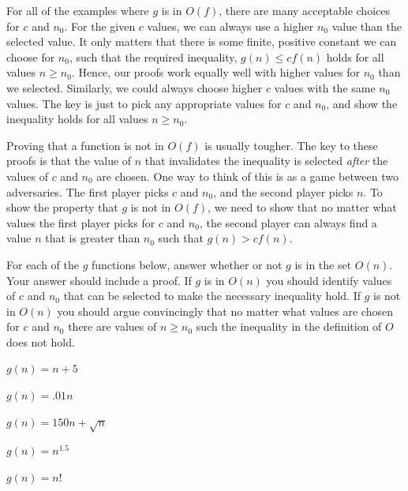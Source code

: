 \begin{schemeregion}
For all of the examples where $g$ is in $O(f)$, there are many acceptable choices for $c$ and $n_0$.  For the given $c$ values, we can always use a higher $n_0$ value than the selected value.  It only matters that there is some finite, positive constant we can choose for $n_0$, such that the required inequality, $g(n) \le cf(n)$ holds for all values $n \ge n_0$.  Hence, our proofs  work equally well with higher values for $n_0$ than we selected.  Similarly, we could always choose higher $c$ values with the same $n_0$ values.  The key is just to pick any appropriate values for $c$ and $n_0$, and show the inequality holds for all values $n \ge n_0$.

Proving that a function is not in $O(f)$ is usually tougher.  The key to these proofs is that the value of $n$ that invalidates the inequality is selected \emph{after} the values of $c$ and $n_0$ are chosen.  One way to think of this is as a game between two adversaries.  The first player picks $c$ and $n_0$, and the second player picks $n$.  To show the property that $g$ is not in $O(f)$, we need to show that no matter what values the first player picks for $c$ and $n_0$, the second player can always find a value $n$ that is greater than $n_0$ such that $g(n) > cf(n)$.

\begin{exercise}\label{ex:bigo}
For each of the $g$ functions below, answer whether or not $g$ is in the set $O(n)$.  Your answer should include a proof.  If $g$ is in $O(n)$ you should identify values of $c$ and $n_0$ that can be selected to make the necessary inequality hold.  If $g$ is not in $O(n)$ you should argue convincingly that no matter what values are chosen for $c$ and $n_0$ there are values of $n \ge n_0$ such the inequality in the definition of $O$ does not hold.


\begin{subexerciselist}
\item $g(n) = n + 5$

\item $g(n) = .01n$

\item $g(n) = 150n + \sqrt{n}$
\item $g(n) = n^{1.5}$
\item $g(n) = n!$


\end{subexerciselist}
\end{exercise}
\end{schemeregion}
